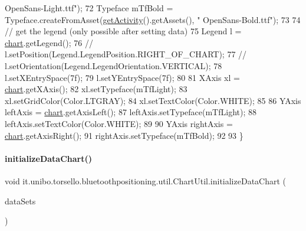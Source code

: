 \begin{DoxyCode}
{      OpenSans-Light.ttf"});
72         Typeface mTfBold = Typeface.createFromAsset(\hyperlink{classit_1_1unibo_1_1torsello_1_1bluetoothpositioning_1_1util_1_1ChartUtil_a59150a6d20b6d0ad2fcf8c1ba858d355_a59150a6d20b6d0ad2fcf8c1ba858d355}{getActivity}().getAssets(), \textcolor{stringliteral}{"
      OpenSans-Bold.ttf"});
73 
74         \textcolor{comment}{// get the legend (only possible after setting data)}
75         Legend l = \hyperlink{classit_1_1unibo_1_1torsello_1_1bluetoothpositioning_1_1util_1_1ChartUtil_a6c34176fdfb85bac1d3aa1529b49ad5f_a6c34176fdfb85bac1d3aa1529b49ad5f}{chart}.getLegend();
76 \textcolor{comment}{//        l.setPosition(Legend.LegendPosition.RIGHT\_OF\_CHART);}
77 \textcolor{comment}{//        l.setOrientation(Legend.LegendOrientation.VERTICAL);}
78         l.setXEntrySpace(7f);
79         l.setYEntrySpace(7f);
80 
81         XAxis xl = \hyperlink{classit_1_1unibo_1_1torsello_1_1bluetoothpositioning_1_1util_1_1ChartUtil_a6c34176fdfb85bac1d3aa1529b49ad5f_a6c34176fdfb85bac1d3aa1529b49ad5f}{chart}.getXAxis();
82         xl.setTypeface(mTfLight);
83         xl.setGridColor(Color.LTGRAY);
84         xl.setTextColor(Color.WHITE);
85 
86         YAxis leftAxis = \hyperlink{classit_1_1unibo_1_1torsello_1_1bluetoothpositioning_1_1util_1_1ChartUtil_a6c34176fdfb85bac1d3aa1529b49ad5f_a6c34176fdfb85bac1d3aa1529b49ad5f}{chart}.getAxisLeft();
87         leftAxis.setTypeface(mTfLight);
88         leftAxis.setTextColor(Color.WHITE);
89 
90         YAxis rightAxis = \hyperlink{classit_1_1unibo_1_1torsello_1_1bluetoothpositioning_1_1util_1_1ChartUtil_a6c34176fdfb85bac1d3aa1529b49ad5f_a6c34176fdfb85bac1d3aa1529b49ad5f}{chart}.getAxisRight();
91         rightAxis.setTypeface(mTfBold);
92 
93     \}
\end{DoxyCode}
\hypertarget{classit_1_1unibo_1_1torsello_1_1bluetoothpositioning_1_1util_1_1ChartUtil_a3393d9aa353849188c02a63d64f2dd2d_a3393d9aa353849188c02a63d64f2dd2d}{}\label{classit_1_1unibo_1_1torsello_1_1bluetoothpositioning_1_1util_1_1ChartUtil_a3393d9aa353849188c02a63d64f2dd2d_a3393d9aa353849188c02a63d64f2dd2d} 
\paragraph{\texorpdfstring{initialize\+Data\+Chart()}{initializeDataChart()}}
{\footnotesize\ttfamily void it.\+unibo.\+torsello.\+bluetoothpositioning.\+util.\+Chart\+Util.\+initialize\+Data\+Chart (\begin{DoxyParamCaption}\item[{Array\+List$<$ I\+Line\+Data\+Set $>$}]{data\+Sets }\end{DoxyParamCaption})\hspace{0.3cm}{\ttfamily [private]}}


